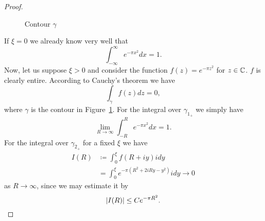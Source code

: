 \begin{proof}
\begin{figure}[!htb]
\begin{minipage}[c]{0.5\textwidth}
\end{minipage}
\caption{Contour $\gamma$}
\label{fig:ContourC}
\end{figure}
	If $\xi = 0$ we already know very well that
\begin{equation*}
	\int _{-\infty} ^\infty e^{-\pi x^2} dx = 1.
\end{equation*}
	Now, let us suppose $\xi > 0$ and consider the function $f(z) = e^{-\pi z^2}$ for $z \in \mathbb{C}$. $f$ is clearly entire. According to Cauchy's theorem we have
\begin{equation*}
	\int _{\gamma} f(z) dz = 0,
\end{equation*}
	where $\gamma$ is the contour in Figure~\ref{fig:ContourC}. For the integral over $\gamma_{1_+}$ we simply have
\begin{equation*}
	\lim _{R \to \infty} \int _{-R} ^R e^{-\pi x^2} dx = 1.
\end{equation*}
	For the integral over $\gamma_{2_+}$ for a fixed $\xi$ we have
\begin{equation*}
\begin{aligned}	
	I(R) 
	&\coloneqq \int _0 ^\xi f(R + i y) i dy \\
	&= \int _0 ^\xi e^{-\pi (R^2 + 2iRy - y^2)} i dy \to 0
\end{aligned}
\end{equation*}
	as $R \to \infty$, since we may estimate it by
\begin{equation*}
	\left|I(R)\right| \leq Ce^{-\pi R^2}.
\end{equation*}

\end{proof}
